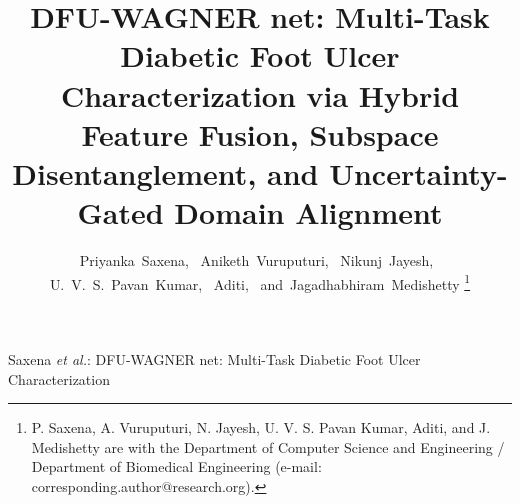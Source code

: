 \documentclass[journal]{IEEEtran}
\begin{document}
\title{DFU-WAGNER net: Multi-Task Diabetic Foot Ulcer Characterization via Hybrid Feature Fusion, Subspace Disentanglement, and Uncertainty-Gated Domain Alignment}

\author{
    Priyanka~Saxena,~
    Aniketh~Vuruputuri,~
    Nikunj~Jayesh,~
    U.~V.~S.~Pavan~Kumar,~
    Aditi,~
    and~Jagadhabhiram~Medishetty%
    \thanks{P. Saxena, A. Vuruputuri, N. Jayesh, U. V. S. Pavan Kumar, Aditi, and J. Medishetty are with the Department of Computer Science and Engineering / Department of Biomedical Engineering (e-mail: corresponding.author@research.org).}%
}

%
{Saxena \MakeLowercase{\textit{et al.}}: DFU-WAGNER net: Multi-Task Diabetic Foot Ulcer Characterization}

\maketitle
\end{document}
